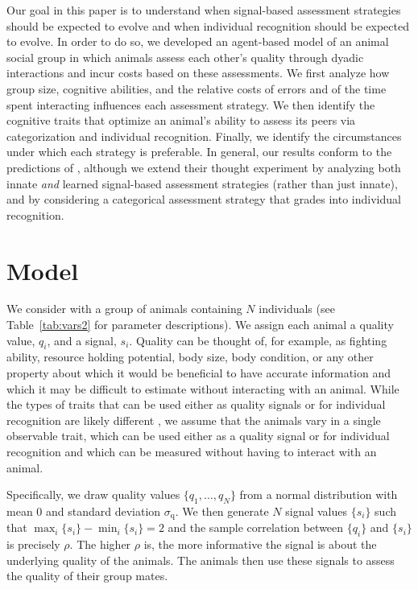 Our goal in this paper is to understand when signal-based assessment strategies should be expected to evolve and when individual recognition should be expected to evolve.  In order to do so, we developed an agent-based model of an animal social group in which animals assess each other's quality through dyadic interactions and incur costs based on these assessments. We first analyze how group size, cognitive abilities, and the relative costs of errors and of the time spent interacting influences each assessment strategy. We then identify the cognitive traits that optimize an animal's ability to assess its peers via categorization and individual recognition. Finally, we identify the circumstances under which each strategy is preferable. In general, our results conform to the predictions of \citet{sheehan2016evotradeoff}, although we extend their thought experiment by analyzing both innate \emph{and} learned signal-based assessment strategies (rather than just innate), and by considering a categorical assessment strategy that grades into individual recognition. 
 

\section*{Model } 

We consider with a group of animals containing $N$ individuals (see Table~\ref{tab:vars2} for parameter descriptions). We assign each animal a quality value, $q_i$, and a signal, $s_i$. Quality can be thought of, for example, as fighting ability, resource holding potential, body size, body condition, or any other property about which it would be beneficial to have accurate information and which it may be difficult to estimate without interacting with an animal. While the types of traits that can be used either as quality signals or for individual recognition are likely different \citep{Dale:2001dv}, we assume that the animals vary in a single observable trait, which can be used either as a quality signal or for individual recognition and which can be measured without having to interact with an animal.  

Specifically, we draw quality values $\{q_1,\dots,q_N\}$ from a normal distribution with mean $0$ and standard deviation $\sigma_\text{q}$. We then generate $N$ signal values $\{s_i\}$ such that 
$\max_i\{s_i\}-\min_i\{s_i\}=2$ and the sample correlation between $\{q_i\}$ and $\{s_i\}$ is precisely $\rho$. 
The higher $\rho$ is, the more informative the signal is about the underlying quality of the animals. The animals then use these signals to assess the quality of their group mates.

